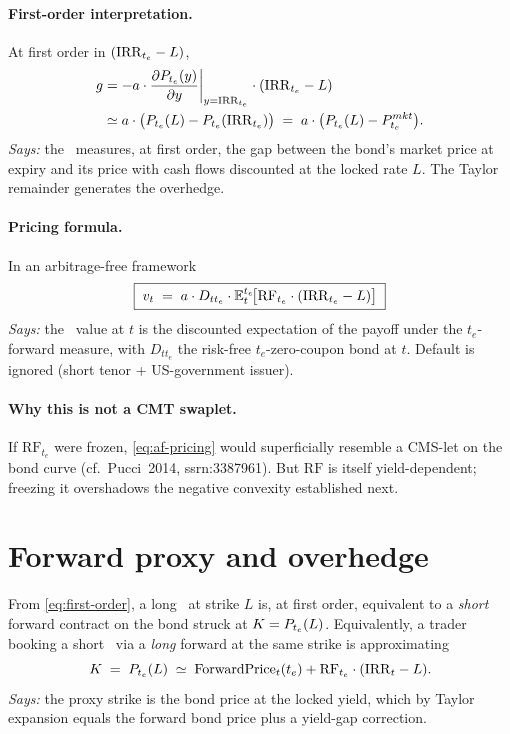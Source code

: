 \documentclass[11pt,a4paper]{article}
\newcommand{\Tlock}{\text{T-Lock}}
\newcommand{\RF}{\mathrm{RF}}
\newcommand{\FwdP}{\mathrm{ForwardPrice}}
\begin{document}
\paragraph{First-order interpretation.} At first order in
$(\mathrm{IRR}_{t_e} - L)$,
\begin{align}
g &= -a \cdot \frac{\partial P_{t_e}(y)}{\partial y}\bigg|_{y=\mathrm{IRR}_{t_e}} \cdot (\mathrm{IRR}_{t_e} - L) \notag\\
  &\simeq a \cdot \bigl( P_{t_e}(L) - P_{t_e}(\mathrm{IRR}_{t_e}) \bigr)
   \;=\; a \cdot \bigl( P_{t_e}(L) - P^{mkt}_{t_e} \bigr).
\label{eq:first-order}
\end{align}
\textit{Says:} the \Tlock\ measures, at first order, the gap between
the bond's market price at expiry and its price with cash flows
discounted at the locked rate $L$. The Taylor remainder generates the
overhedge.

\paragraph{Pricing formula.} In an arbitrage-free framework
\begin{equation}\label{eq:af-pricing}
\boxed{\;
v_t \;=\; a \cdot D_{t t_e} \cdot \E^{t_e}_t\!\bigl[ \RF_{t_e}\cdot(\IRR_{t_e} - L) \bigr]\;
}
\end{equation}
\textit{Says:} the \Tlock\ value at $t$ is the discounted expectation
of the payoff under the $t_e$-forward measure, with $D_{tt_e}$ the
risk-free $t_e$-zero-coupon bond at $t$. Default is ignored (short
tenor + US-government issuer).

\paragraph{Why this is not a CMT swaplet.} If $\RF_{t_e}$ were frozen,
\eqref{eq:af-pricing} would superficially resemble a CMS-let on the
bond curve (cf.\ Pucci~2014, ssrn:3387961). But $\RF$ is itself
yield-dependent; freezing it overshadows the negative convexity
established next.

\section{Forward proxy and overhedge}\label{sec:overhedge}

From \eqref{eq:first-order}, a long \Tlock\ at strike $L$ is, at first
order, equivalent to a \emph{short} forward contract on the bond
struck at $K = P_{t_e}(L)$. Equivalently, a trader booking a short
\Tlock\ via a \emph{long} forward at the same strike is approximating
\begin{equation}\label{eq:K-approx}
  K \;=\; \Bond{t_e}{L}
  \;\simeq\; \FwdP_t(t_e) + \RF_{t_e}\cdot(\IRR_t - L).
\end{equation}
\textit{Says:} the proxy strike is the bond price at the locked
yield, which by Taylor expansion equals the forward bond price plus a
yield-gap correction.
\end{document}
